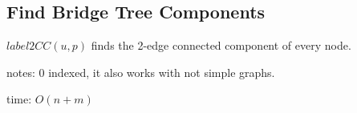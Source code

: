 \subsection{Find Bridge Tree Components}

$label2CC(u, p)$ finds the 2-edge connected component of every node.

notes: 0 indexed, it also works with not simple graphs.


time: $O(n + m)$
